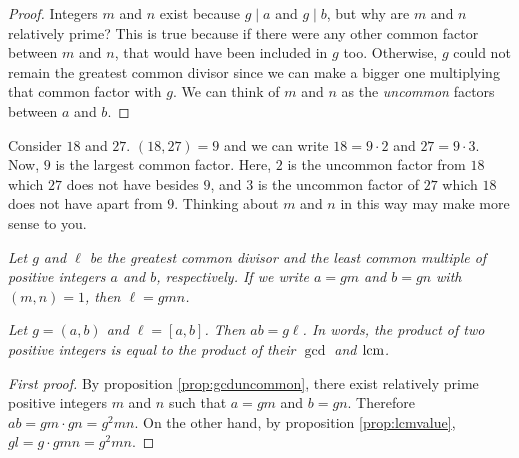 \documentclass{subfile}
\begin{document}
	\begin{proof}
		Integers $m$ and $n$ exist because $g\mid a$ and $g\mid b$, but why are $m$ and $n$ relatively prime? This is true because if there were any other common factor between $m$ and $n$, that would have been included in $g$ too. Otherwise, $g$ could not remain the greatest common divisor since we can make a bigger one multiplying that common factor with $g$. We can think of $m$ and $n$ as the \textit{uncommon} factors between $a$ and $b$.
	\end{proof}

	\begin{example}
		Consider $18$ and $27$. $(18,27)=9$ and we can write $18=9\cdot2$ and $27=9\cdot3$. Now, $9$ is the largest common factor. Here, $2$ is the uncommon factor from $18$ which $27$ does not have besides $9$, and $3$ is the uncommon factor of $27$ which $18$ does not have apart from $9$. Thinking about $m$ and $n$ in this way may make more sense to you.
	\end{example}

	\begin{proposition}\slshape\label{prop:lcmvalue}
		Let $g$ and $\ell$ be the greatest common divisor and the least common multiple of positive integers $a$ and $b$, respectively. If we write $a=gm$ and $b=gn$ with $(m,n)=1$, then $\ell=gmn$.
	\end{proposition}

	\begin{proposition}\slshape
		Let $g=(a,b)$ and $\ell = [a,b]$. Then $ab=g\ell$. In words, the product of two positive integers is equal to the product of their $\gcd$ and $\operatorname{lcm}$.
	\end{proposition}


	\begin{proof}[First proof]
		By proposition \eqref{prop:gcduncommon}, there exist relatively prime positive integers $m$ and $n$ such that $a=gm$ and $b=gn$. Therefore $ab=gm\cdot gn=g^2mn$. On the other hand, by proposition \eqref{prop:lcmvalue}, $gl=g\cdot gmn=g^2mn$.
	\end{proof}
\end{document}
